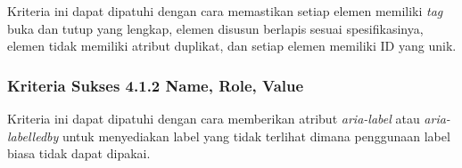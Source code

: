 Kriteria ini dapat dipatuhi dengan cara memastikan setiap elemen memiliki \textit{tag} buka dan tutup yang lengkap, elemen disusun berlapis sesuai spesifikasinya, elemen tidak memiliki atribut duplikat, dan setiap elemen memiliki ID yang unik.

\subsubsection{Kriteria Sukses 4.1.2 Name, Role, Value}
\label{subsubsec:peningkatan_A_4.1.2}

Kriteria ini dapat dipatuhi dengan cara memberikan atribut \textit{aria-label} atau \textit{aria-labelledby} untuk menyediakan label yang tidak terlihat dimana penggunaan label biasa tidak dapat dipakai.
